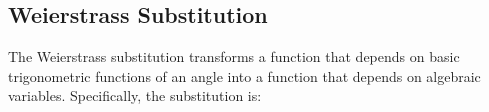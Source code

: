 \subsection{Weierstrass Substitution}
The Weierstrass substitution transforms a function that depends on basic trigonometric functions of an angle into a function that depends on algebraic variables. Specifically, the substitution is:

